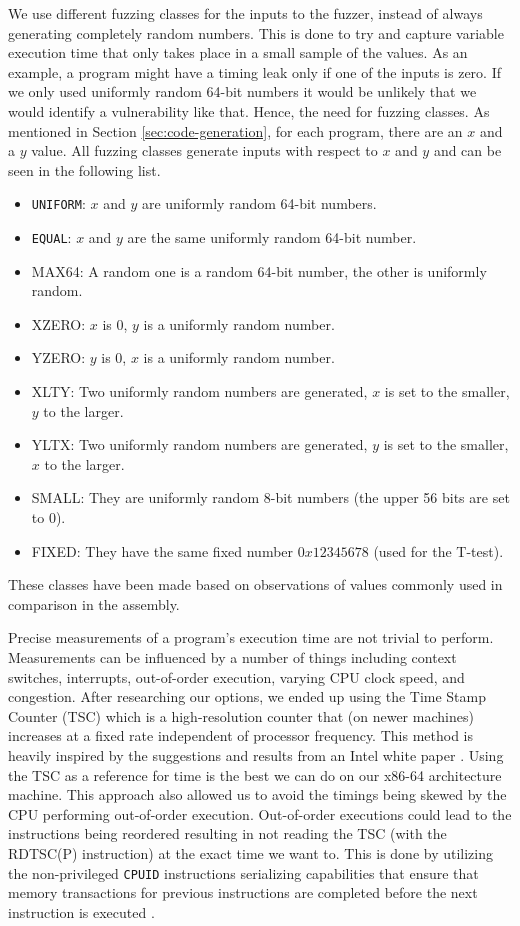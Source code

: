 We use different fuzzing classes for the inputs to the fuzzer, instead of always generating completely random numbers. 
This is done to try and capture variable execution time that only takes place in a small sample of the values. 
As an example, a program might have a timing leak only if one of the inputs is zero. 
If we only used uniformly random 64-bit numbers it would be unlikely that we would identify a vulnerability like that. 
Hence, the need for fuzzing classes. 
As mentioned in Section \ref{sec:code-generation}, for each program, there are an $x$ and a $y$ value. 
All fuzzing classes generate inputs with respect to $x$ and $y$ and can be seen in the following list.
\begin{itemize}
    \item \texttt{UNIFORM}: $x$ and $y$ are uniformly random 64-bit numbers.
    \item \texttt{EQUAL}:  $x$ and $y$ are the same uniformly random 64-bit number.
    \item MAX64:   A random one is a random 64-bit number, the other is uniformly random.
    \item XZERO:   $x$ is 0, $y$ is a uniformly random number.
    \item YZERO:   $y$ is 0, $x$ is a uniformly random number.
    \item XLTY:    Two uniformly random numbers are generated, $x$ is set to the smaller, $y$ to the larger.
    \item YLTX:    Two uniformly random numbers are generated, $y$ is set to the smaller, $x$ to the larger.
    \item SMALL:   They are uniformly random 8-bit numbers (the upper 56 bits are set to 0).
    \item FIXED:   They have the same fixed number $0x12345678$ (used for the T-test).
\end{itemize}
These classes have been made based on observations of values commonly used in comparison in the assembly.

Precise measurements of a program's execution time are not trivial to perform. 
Measurements can be influenced by a number of things including context switches, interrupts, out-of-order execution, varying CPU clock speed, and congestion. 
After researching our options, we ended up using the Time Stamp Counter (TSC) which is a high-resolution counter that (on newer machines) increases at a fixed rate independent of processor frequency. 
This method is heavily inspired by the suggestions and results from an Intel white paper \citep{intel-benchmark-code-execution}.
Using the TSC as a reference for time is the best we can do on our x86-64 architecture machine.
This approach also allowed us to avoid the timings being skewed by the CPU performing out-of-order execution.
Out-of-order executions could lead to the instructions being reordered resulting in not reading the TSC (with the RDTSC(P) instruction) at the exact time we want to. 
This is done by utilizing the non-privileged \texttt{CPUID} instructions serializing capabilities that ensure that memory transactions for previous instructions are completed before the next instruction is executed \citep[a]{intel-reference}.

